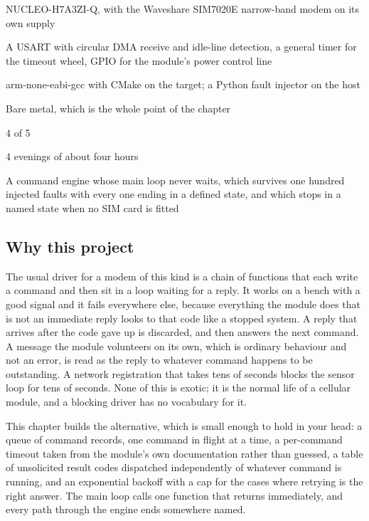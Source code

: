 
\begin{keyfacts}
\item[Board] NUCLEO-H7A3ZI-Q, with the Waveshare SIM7020E narrow-band modem on its own supply
\item[Peripherals] A USART with circular DMA receive and idle-line detection, a general timer for the timeout wheel, GPIO for the module's power control line
\item[Toolchain] arm-none-eabi-gcc with CMake on the target; a Python fault injector on the host
\item[Operating system] Bare metal, which is the whole point of the chapter
\item[Difficulty] 4 of 5
\item[Effort] 4 evenings of about four hours
\item[Deliverable] A command engine whose main loop never waits, which survives one hundred injected faults with every one ending in a defined state, and which stops in a named state when no SIM card is fitted
\end{keyfacts}

\subsection*{Why this project}

The usual driver for a modem of this kind is a chain of functions that each
write a command and then sit in a loop waiting for a reply. It works on a bench
with a good signal and it fails everywhere else, because everything the module
does that is not an immediate reply looks to that code like a stopped system. A
reply that arrives after the code gave up is discarded, and then answers the
next command. A message the module volunteers on its own, which is ordinary
behaviour and not an error, is read as the reply to whatever command happens to
be outstanding. A network registration that takes tens of seconds blocks the
sensor loop for tens of seconds. None of this is exotic; it is the normal life
of a cellular module, and a blocking driver has no vocabulary for it.

This chapter builds the alternative, which is small enough to hold in your head:
a queue of command records, one command in flight at a time, a per-command
timeout taken from the module's own documentation rather than guessed, a table
of unsolicited result codes dispatched independently of whatever command is
running, and an exponential backoff with a cap for the cases where retrying is
the right answer. The main loop calls one function that returns immediately, and
every path through the engine ends somewhere named.

